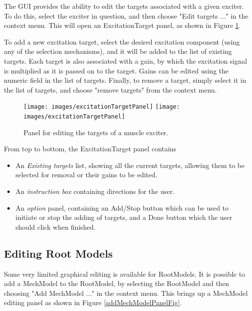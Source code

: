 \documentclass{article}
\begin{document}
The GUI provides the ability to edit the targets associated with a
given exciter. To do this, select the exciter in question, and then
choose {\sf "Edit targets ..."} in the context menu. This will open an
ExcitationTarget panel, as shown in Figure \ref{excitationTargetPanelFig}.

To add a new excitation target, select the desired excitation
component (using any of the selection mechanisms), and it will be
added to the list of existing targets. Each target is also associated
with a gain, by which the excitation signal is multiplied as it is
passed on to the target. Gains can be edited using the numeric field
in the list of targets. Finally, to remove a target, simply select it
in the list of targets, and choose {\sf "remove targets"} from the context
menu.

\begin{figure}
\begin{center}
\iflatexml
\texttt{[image: images/excitationTargetPanel]}
\else
\texttt{[image: images/excitationTargetPanel]}
\fi
\end{center}
\caption{Panel for editing the targets of a muscle exciter.}%
\label{excitationTargetPanelFig}
\end{figure}

From top to bottom, the ExcitationTarget panel contains

\begin{itemize}

\item An {\it Existing targets} list, showing all the current
targets, allowing them to be selected for removal or their gains to be edited.

\item An {\it instruction box} containing directions for the user.

\item An {\it option} panel, containing an {\sf Add/Stop} button which can be used
to initiate or stop the adding of targets, and a {\sf Done} button which
the user should click when finished.

\end{itemize}

\subsection{Editing Root Models}

Some very limited graphical editing is available for RootModels.  It
is possible to add a MechModel to the RootModel, by selecting the
RootModel and then choosing {\sf "Add MechModel ..."} in the context
menu. This brings up a MechModel editing panel as shown in
Figure \ref{addMechModelPanelFig}.
\end{document}
